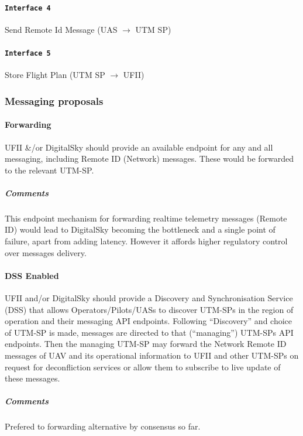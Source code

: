 \documentclass{ua_wgs_base}
\begin{document}
\paragraph{\texttt{Interface 4}}

Send Remote Id Message (UAS $\rightarrow$ UTM SP) 

\paragraph{\texttt{Interface 5}}

Store Flight Plan (UTM SP $\rightarrow$ UFII)


\subsubsection{Messaging proposals}

\paragraph{Forwarding}

UFII \&/or DigitalSky should provide an available endpoint for any
and all messaging, including Remote ID (Network) messages. These would
be forwarded to the relevant UTM-SP.

\subparagraph{Comments}

This endpoint mechanism for forwarding realtime telemetry messages 
(Remote ID) would lead to DigitalSky becoming the bottleneck and a single
point of failure, apart from adding latency. However it affords higher 
regulatory control over messages delivery.


\paragraph{DSS Enabled}

UFII and/or DigitalSky should provide a Discovery and Synchronisation
Service (DSS) that allows Operators/Pilots/UASs to discover UTM-SPs in the
region of operation and their messaging API endpoints. Following ``Discovery''
and choice of UTM-SP is made, messages are directed to that (``managing'') 
UTM-SPs API endpoints. Then the managing UTM-SP may forward the Network Remote
ID messages of UAV and its operational information to UFII and other UTM-SPs 
on request for deconfliction services or allow them to subscribe to live 
update of these messages. 

\subparagraph{Comments}

Prefered to forwarding alternative by consensus so far.
\end{document}
